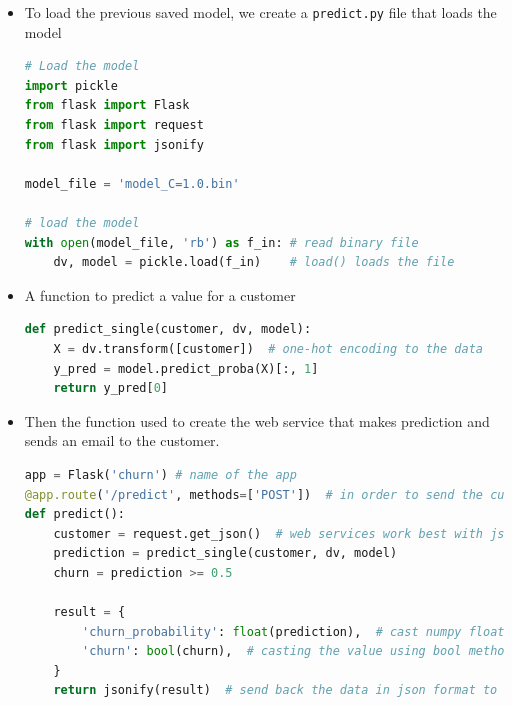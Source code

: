 \documentclass[letterpaper,12pt,notitlepage,twoside]{report}
\begin{document}
\begin{itemize}[noitemsep, topsep=0pt]
\item To load the previous saved model, we create a \texttt{predict.py} file that loads the model
\begin{lstlisting}[language=python, numbers=none]
# Load the model
import pickle
from flask import Flask
from flask import request
from flask import jsonify

model_file = 'model_C=1.0.bin'

# load the model
with open(model_file, 'rb') as f_in: # read binary file
    dv, model = pickle.load(f_in)    # load() loads the file 
\end{lstlisting}
\item A function to predict a value for a customer
\begin{lstlisting}[language=python, numbers=none]
def predict_single(customer, dv, model):
    X = dv.transform([customer])  # one-hot encoding to the data 
    y_pred = model.predict_proba(X)[:, 1]
    return y_pred[0]
\end{lstlisting}
\item Then the function used to create the web service that makes prediction and sends an email to the customer.
\begin{lstlisting}[language=python, numbers=none]
app = Flask('churn') # name of the app
@app.route('/predict', methods=['POST'])  # in order to send the customer information we need to post its data.
def predict():
    customer = request.get_json()  # web services work best with json frame
    prediction = predict_single(customer, dv, model)
    churn = prediction >= 0.5

    result = {
        'churn_probability': float(prediction),  # cast numpy float type to python native float type
        'churn': bool(churn),  # casting the value using bool method
    }
    return jsonify(result)  # send back the data in json format to the user
\end{lstlisting}
\end{itemize}
\end{document}
